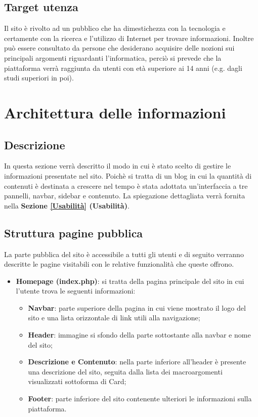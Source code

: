 \documentclass[12pt]{article}
\begin{document}
	\subsection{Target utenza}
		Il sito è rivolto ad un pubblico che ha dimestichezza con la tecnologia e certamente con la ricerca e l'utilizzo di Internet per trovare informazioni. Inoltre può essere consultato da persone che desiderano acquisire delle nozioni sui principali argomenti riguardanti l'informatica, perciò si prevede che la piattaforma verrà raggiunta da utenti con età superiore ai 14 anni (e.g. dagli studi superiori in poi).
		
	\section{Architettura delle informazioni}
	\subsection{Descrizione}
		In questa sezione verrà descritto il modo in cui è stato scelto di gestire le informazioni presentate nel sito. Poichè si tratta di un blog in cui la quantità di contenuti è destinata a crescere nel tempo è stata adottata un'interfaccia a tre pannelli, navbar, sidebar e contenuto. La spiegazione dettagliata verrà fornita nella \textbf{Sezione \ref{Usabilità} (Usabilità)}.
	\subsection{Struttura pagine pubblica}
		La parte pubblica del sito è accessibile a tutti gli utenti e di seguito verranno descritte le pagine visitabili con le relative funzionalità che queste offrono.
		\begin{itemize}
				\item \textbf{Homepage (index.php)}: si tratta della pagina principale del sito in cui l'utente trova le seguenti informazioni:
				\begin{itemize}
						\item \textbf{Navbar}: parte superiore della pagina in cui viene mostrato il logo del sito e una lista orizzontale di link utili alla navigazione;
						\item \textbf{Header}: immagine si sfondo della parte sottostante alla navbar e nome del sito;
						\item \textbf{Descrizione e Contenuto}: nella parte inferiore all'header è presente una descrizione del sito, seguita dalla lista dei macroargomenti visualizzati sottoforma di Card;
						\item \textbf{Footer}: parte inferiore del sito contenente ulteriori le informazioni sulla piattaforma.
				\end{itemize}
		\end{itemize}
\end{document}

